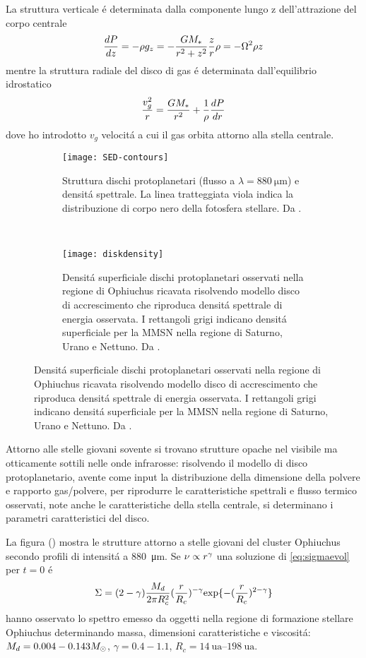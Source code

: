 La struttura verticale \'e determinata dalla componente lungo z dell'attrazione del corpo centrale
\begin{equation}
\TDy{z}{P}=-\rho g_z=-\frac{GM_*}{r^2+z^2}\frac{z}{r}\rho=-\Omega^2\rho z
\end{equation}
mentre la struttura radiale del disco di gas \'e determinata dall'equilibrio idrostatico
\begin{equation}
\frac{v_g^2}{r}=\frac{GM_*}{r^2}+\frac{1}{\rho}\TDy{r}{P}
\end{equation}
dove ho introdotto $v_g$ velocit\'a a cui il gas orbita attorno alla stella centrale.

\begin{figure}[!ht]
	\begin{subfigure}[b]{0.39\textwidth}
		\centering
		\texttt{[image: SED-contours]}
		\caption{Struttura dischi protoplanetari (flusso a $\lambda=\SI{880}{\micro\meter}$) e densit\'a spettrale. La linea tratteggiata viola indica la distribuzione di corpo nero della fotosfera stellare. Da \cite{andrews2010protoplanetary}.}\label{fig:SED-contours}
	\end{subfigure}
	~
	\begin{subfigure}[b]{0.55\textwidth}
		\texttt{[image: diskdensity]}
		\caption{Densit\'a superficiale dischi protoplanetari osservati nella regione di Ophiuchus ricavata risolvendo modello disco di accrescimento che riproduca densit\'a spettrale di energia osservata. I rettangoli grigi indicano densit\'a superficiale per la MMSN nella regione di Saturno, Urano e Nettuno. Da \cite{andrews2010protoplanetary}.}\label{fig:diskdensity}
	\end{subfigure}
\end{figure}

Attorno alle stelle giovani sovente si trovano strutture opache nel visibile ma otticamente sottili nelle onde infrarosse: risolvendo il modello di disco protoplanetario, avente come input la distribuzione della dimensione della polvere e rapporto gas/polvere, per riprodurre le caratteristiche spettrali e flusso termico osservati, note anche le caratteristiche della stella centrale, si determinano i parametri caratteristici del disco.

La figura () mostra le strutture attorno a stelle giovani del cluster Ophiuchus secondo profili di intensit\'a a \SI{880}{\micro\meter}. Se $\nu\propto r\expy{\gamma}$ una soluzione di \eqref{eq:sigmaevol} per $t=0$ \'e
\begin{equation}
\Sigma=(2-\gamma)\frac{M_d}{2\pi R_c^2}(\frac{r}{R_c})\expy{-\gamma}\Exp{-(\frac{r}{R_c})\expy{2-\gamma}}
\end{equation}
\cite{andrews2010protoplanetary} hanno osservato lo spettro emesso da oggetti nella regione di formazione stellare Ophiuchus determinando massa, dimensioni caratteristiche e viscosit\'a: $M_d=0.004-0.143\msun{}$, $\gamma=0.4-1.1$, $R_c=\SIrange{14}{198}{\astronomicalunit}$.

